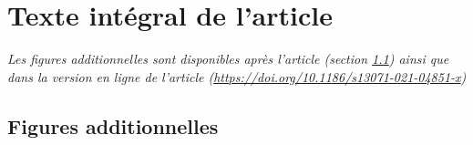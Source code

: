 \documentclass[12pt,twoside]{reedthesis}
\begin{document}
\hypertarget{full-article-1}{%
\section{Texte intégral de l'article}\label{full-article-1}}

\emph{Les figures additionnelles sont disponibles après l'article (section \ref{add-fig}) ainsi que dans la version en ligne de l'article (\url{https://doi.org/10.1186/s13071-021-04851-x})}

\begingroup 
\renewcommand{\headrulewidth}{0pt}

\markboth{}{}


\endgroup

\hypertarget{add-fig}{%
\subsection{Figures additionnelles}\label{add-fig}}
\end{document}
